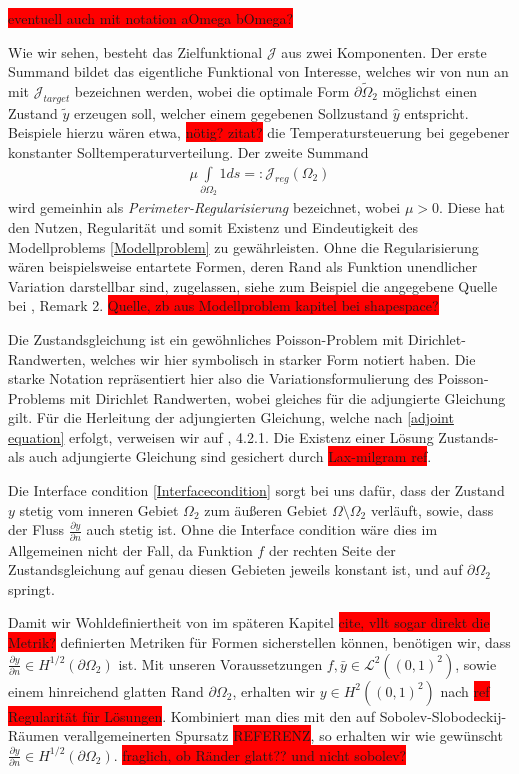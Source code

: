 \colorbox{red}{eventuell auch mit notation aOmega bOmega?}

Wie wir sehen, besteht das Zielfunktional $\mathcal{J}$ aus zwei Komponenten. Der erste Summand bildet das eigentliche Funktional von Interesse, welches wir von nun an mit $\mathcal{J}_{target}$ bezeichnen werden, wobei die optimale Form $\partial\tilde{\Omega}_2$ möglichst einen Zustand $\tilde{y}$ erzeugen soll, welcher einem gegebenen Sollzustand $\hat{y}$ entspricht. Beispiele hierzu wären etwa, \colorbox{red}{nötig? zitat?} die Temperatursteuerung bei gegebener konstanter Solltemperaturverteilung. Der zweite Summand
\begin{align*}
	\mu\underset{\partial\Omega_2}{\int} 1 ds =: \mathcal{J}_{reg}(\Omega_2)
\end{align*}
wird gemeinhin als \textit{Perimeter-Regularisierung} bezeichnet, wobei $\mu > 0$. Diese hat den Nutzen, Regularität und somit Existenz und Eindeutigkeit des Modellproblems \ref{Modellproblem} zu gewährleisten. Ohne die Regularisierung wären beispielsweise entartete Formen, deren Rand als Funktion unendlicher Variation darstellbar sind, zugelassen, siehe zum Beispiel die angegebene Quelle bei \cite{Lagrange-Newton}, Remark 2. \colorbox{red}{Quelle, zb aus Modellproblem kapitel bei shapespace?}

Die Zustandsgleichung ist ein gewöhnliches Poisson-Problem mit Dirichlet-Randwerten, welches wir hier symbolisch in starker Form notiert haben. Die starke Notation repräsentiert hier also die Variationsformulierung des Poisson-Problems mit Dirichlet Randwerten, wobei gleiches für die adjungierte Gleichung gilt. Für die Herleitung der adjungierten Gleichung, welche nach \ref{adjoint equation} erfolgt, verweisen wir auf \cite{shape_space}, 4.2.1. Die Existenz einer Lösung Zustands- als auch adjungierte Gleichung sind gesichert durch \colorbox{red}{Lax-milgram ref}.

Die Interface condition \ref{Interfacecondition} sorgt bei uns dafür, dass der Zustand $y$ stetig vom inneren Gebiet $\Omega_2$ zum äußeren Gebiet $\Omega \setminus \Omega_2$ verläuft, sowie, dass der Fluss $\frac{\partial y }{\partial n}$ auch stetig ist. Ohne die Interface condition wäre dies im Allgemeinen nicht der Fall, da Funktion $f$ der rechten Seite der Zustandsgleichung auf genau diesen Gebieten jeweils konstant ist, und auf $\partial\Omega_2$ springt.

Damit wir Wohldefiniertheit von im späteren Kapitel \colorbox{red}{cite, vllt sogar direkt die Metrik?} definierten Metriken für Formen sicherstellen können, benötigen wir, dass $\frac{\partial y}{\partial n} \in H^{1/2}(\partial\Omega_2)$ ist. Mit unseren Voraussetzungen $f,\bar{y} \in \mathcal{L}^2((0,1)^2)$, sowie einem hinreichend glatten Rand $\partial\Omega_2$, erhalten wir $y\in H^2((0,1)^2)$ nach \colorbox{red}{ref Regularität für Lösungen}. Kombiniert man dies mit den auf Sobolev-Slobodeckij-Räumen verallgemeinerten Spursatz \colorbox{red}{REFERENZ}, so erhalten wir wie gewünscht $\frac{\partial y}{\partial n} \in H^{1/2}(\partial\Omega_2)$. \colorbox{red}{fraglich, ob Ränder glatt?? und nicht sobolev?}

